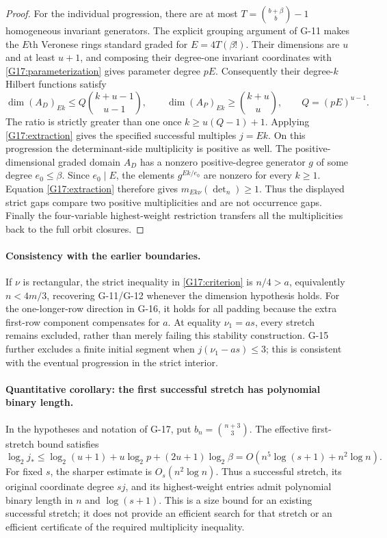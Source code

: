 \begin{proof}
For the individual progression, there are at most
$T=\binom{b+\beta}{b}-1$ homogeneous invariant generators.
The explicit grouping argument of G-11 makes the $E$th Veronese
rings standard graded for $E=4T(\beta!)$.
Their dimensions are $u$ and at least $u+1$, and composing their
degree-one invariant coordinates with \eqref{G17:parameterization}
gives parameter degree $pE$. Consequently their degree-$k$ Hilbert
functions satisfy
\[
 \dim(A_D)_{Ek}\leq Q\binom{k+u-1}{u-1},\qquad
 \dim(A_P)_{Ek}\geq\binom{k+u}{u},\qquad Q=(pE)^{u-1}.
\]
The ratio is strictly greater than one once
$k\geq u(Q-1)+1$. Applying \eqref{G17:extraction} gives the
specified successful multiples $j=Ek$.
On this progression the determinant-side multiplicity is positive as
well. The positive-dimensional graded domain $A_D$ has a nonzero
positive-degree generator $g$ of some degree $e_0\leq\beta$.
Since $e_0\mid E$, the elements $g^{Ek/e_0}$ are nonzero for every
$k\geq1$. Equation \eqref{G17:extraction} therefore gives
$m_{Ek\nu}(\det_n)\geq1$. Thus the displayed strict gaps compare
two positive multiplicities and are not occurrence gaps.
Finally the four-variable highest-weight restriction transfers
all the multiplicities back to the full orbit closures.
\end{proof}

\paragraph{Consistency with the earlier boundaries.}
If $\nu$ is rectangular, the strict inequality in
\eqref{G17:criterion} is $n/4>a$, equivalently $n<4m/3$,
recovering G-11/G-12 whenever the dimension hypothesis holds.
For the one-longer-row direction in G-16, it holds for all padding
because the extra first-row component compensates for $a$.
At equality $\nu_1=as$, every stretch remains excluded, rather
than merely failing this stability construction.
G-15 further excludes a finite initial segment when
$j(\nu_1-as)\leq3$; this is consistent with the eventual
progression in the strict interior.

\paragraph{Quantitative corollary: the first successful stretch has polynomial binary length.}
In the hypotheses and notation of G-17, put
$b_n=\binom{n+3}{3}$. The effective first-stretch bound satisfies
\begin{equation}\label{G17:bitlength}
 \log_2j_*
 \leq\log_2(u+1)+u\log_2p+(2u+1)\log_2\beta
 =O\!\left(n^5\log(s+1)+n^2\log n\right).
\end{equation}
For fixed $s$, the sharper estimate is $O_s(n^2\log n)$.
Thus a successful stretch, its original coordinate degree $sj$, and
its highest-weight entries admit polynomial binary length in $n$ and
$\log(s+1)$. This is a size bound for an existing successful stretch;
it does not provide an efficient search for that stretch or an efficient
certificate of the required multiplicity inequality.

